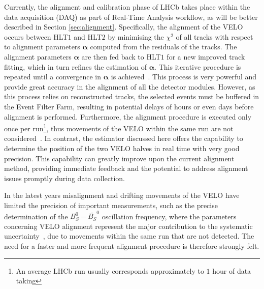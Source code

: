 Currently, the alignment and calibration phase of LHCb takes place within the data acquisition (DAQ) as part of Real-Time Analysis workflow, as will be better described in Section \ref{sec:alignment}. Specifically, the alignment of the VELO occurs between HLT$1$ and HLT$2$ by minimising the $\chi^2$ of all tracks with respect to alignment parameters $\mathbf{\alpha}$ computed from the residuals of the tracks. The alignment parameters $\mathbf{\alpha}$ are then fed back to HLT$1$ for a new improved track fitting, which in turn refines the estimation of $\mathbf{\alpha}$. This iterative procedure is repeated until a convergence in $\mathbf{\alpha}$ is achieved~\cite{FRUHWIRTH1987444, Frühwirth:803519}. This process is very powerful and provide great accuracy in the alignment of all the detector modules. However, as this process relies on reconstructed tracks, the selected events must be buffered in the Event Filter Farm, resulting in potential delays of hours or even days before alignment is performed. Furthermore, the alignment procedure is executed only once per run\footnote{An average LHCb run usually corresponds approximately to $1$ hour of data taking}, thus movements of the VELO within the same run are not considered~\cite{Dziurda:2640712}. In contrast, the estimator discussed here offers the capability to determine the position of the two VELO halves in real time with very good precision. This capability can greatly improve upon the current alignment method, providing immediate feedback and the potential to address alignment issues promptly during data collection.

In the latest years misalignment and drifting movements of the VELO have limited the precision of important measurements, such as the precise determination of the $B_S^0-\overline{B_S} ^0$ oscillation frequency, where the parameters concerning VELO alignment represent the major contribution to the systematic uncertainty~\cite{b0b0soscillation}, due to movements within the same run that are not detected. The need for a faster and more frequent alignment procedure is therefore strongly felt.  
    


